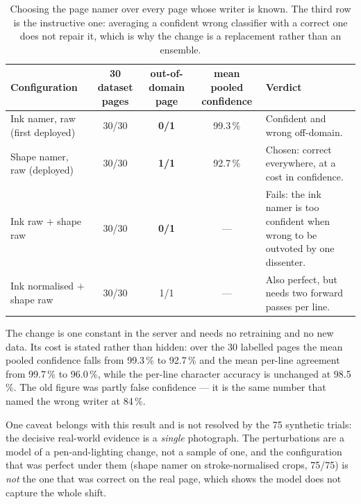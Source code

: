 \begin{table}[!htbp]
\centering
\fontsize{8.5}{10.2}\selectfont
\setlength{\tabcolsep}{4pt}
\begin{tabularx}{\linewidth}{|p{3.6cm}|c|c|c|X|}
\hline
\textbf{Configuration} & \textbf{30 dataset pages} & \textbf{out-of-domain page} & \textbf{mean pooled confidence} & \textbf{Verdict} \\
\hline
Ink namer, raw (first deployed) & 30/30 & \textbf{0/1} & 99.3\,\% & Confident and wrong off-domain. \\
\hline
Shape namer, raw (deployed) & 30/30 & \textbf{1/1} & 92.7\,\% & Chosen: correct everywhere, at a cost in confidence. \\
\hline
Ink raw $+$ shape raw & 30/30 & \textbf{0/1} & --- & Fails: the ink namer is too confident when wrong to be outvoted by one dissenter. \\
\hline
Ink normalised $+$ shape raw & 30/30 & 1/1 & --- & Also perfect, but needs two forward passes per line. \\
\hline
\end{tabularx}
\caption{Choosing the page namer over every page whose writer is known. The third row is the instructive one: averaging a confident wrong classifier with a correct one does not repair it, which is why the change is a replacement rather than an ensemble.}
\label{tab:later-namersweep}
\end{table}

The change is one constant in the server and needs no retraining and no new data. Its cost is stated rather than hidden: over the 30 labelled pages the mean pooled confidence falls from 99.3\,\% to 92.7\,\% and the mean per-line agreement from 99.7\,\% to 96.0\,\%, while the per-line character accuracy is unchanged at 98.5\,\%. The old figure was partly false confidence --- it is the same number that named the wrong writer at 84\,\%.

One caveat belongs with this result and is not resolved by the 75 synthetic trials: the decisive real-world evidence is a \emph{single} photograph. The perturbations are a model of a pen-and-lighting change, not a sample of one, and the configuration that was perfect under them (shape namer on stroke-normalised crops, 75/75) is \emph{not} the one that was correct on the real page, which shows the model does not capture the whole shift.

